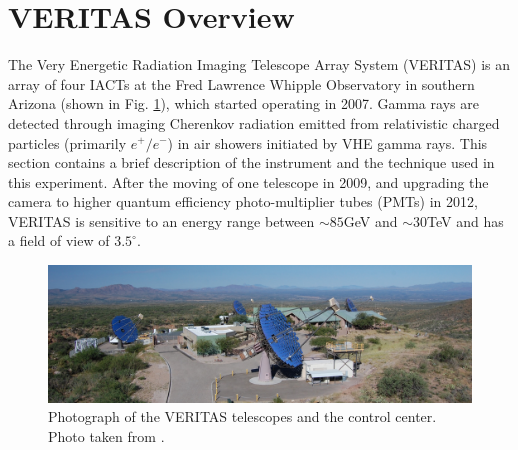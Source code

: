\documentclass[main.tex]{subfiles}
\begin{document}
\section{VERITAS Overview}
The Very Energetic Radiation Imaging Telescope Array System (VERITAS) \cite{Weekes:1997np} is an array of four IACTs at the Fred Lawrence Whipple Observatory in southern Arizona (shown in Fig. \ref{veritas_standard}), which started operating in 2007. Gamma rays are detected through imaging Cherenkov radiation emitted from relativistic charged particles (primarily $e^+/e^-$) in air showers initiated by VHE gamma rays. This section contains a brief description of the instrument and the technique used in this experiment. After the moving of one telescope in 2009, and upgrading the camera to higher quantum efficiency photo-multiplier tubes (PMTs) in 2012, VERITAS is sensitive to an energy range between $\sim85$GeV and $\sim30$TeV and has a field of view of $3.5^\circ$.
\begin{figure}[htbp]
  \centering
  \includegraphics[width=\linewidth]{images/veritas_standard}
  \caption[Photograph of the VERITAS telescopes and the control center.]{Photograph of the VERITAS telescopes and the control center. Photo taken from \cite{veritas_web}.}
  \label{veritas_standard}
\end{figure}
\end{document}
